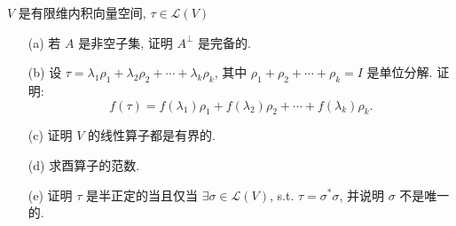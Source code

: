 \documentclass{assignment}
\begin{document}
\begin{prob}
    $V$ 是有限维内积向量空间, $\tau\in\mathcal{L}(V)$
    \begin{itemize}
        \item[(a)] 若 $A$ 是非空子集, 证明 $A^{\perp}$ 是完备的.
        \item[(b)] 设 $\tau=\lambda_1\rho_1+\lambda_2\rho_2+\cdots+\lambda_k\rho_k$, 其中 $\rho_1+\rho_2+\cdots+\rho_k=I$ 是单位分解. 证明:
        \[
            f(\tau)=f(\lambda_1)\rho_1+f(\lambda_2)\rho_2+\cdots+f(\lambda_k)\rho_k.
        \]
        \item[(c)] 证明 $V$ 的线性算子都是有界的.
        \item[(d)] 求酉算子的范数.
        \item[(e)] 证明 $\tau$ 是半正定的当且仅当 $\exists\sigma\in\mathcal{L}(V)$, s.t. $\tau=\sigma^*\sigma$, 并说明 $\sigma$ 不是唯一的.
    \end{itemize}
\end{prob}
\end{document}
